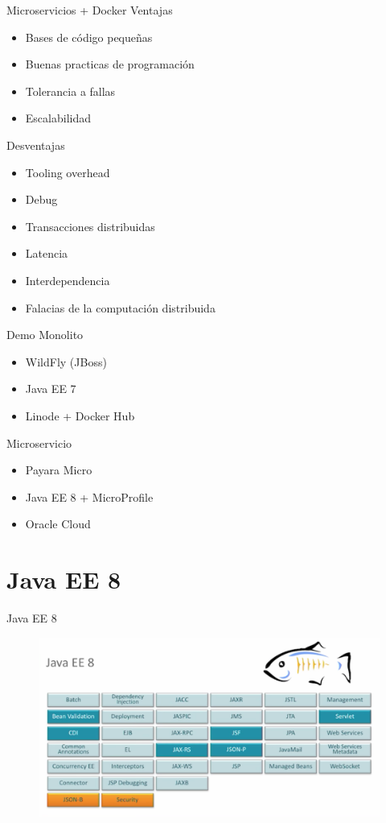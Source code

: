 \documentclass{beamer}
\begin{document}
\begin{frame}{Microservicios + Docker}
Ventajas
\begin{itemize}
	\item Bases de código pequeñas
	\item Buenas practicas de programación
	\item Tolerancia a fallas
	\item Escalabilidad
\end{itemize}
Desventajas
\begin{itemize}
	\item Tooling overhead
	\item Debug
	\item Transacciones distribuidas
	\item Latencia
	\item Interdependencia
	\item Falacias de la computación distribuida
\end{itemize}
\end{frame}

\begin{frame}{Demo}
Monolito
\begin{itemize}
	\item WildFly (JBoss)
	\item Java EE 7
	\item Linode + Docker Hub
\end{itemize}

Microservicio
\begin{itemize}
	\item Payara Micro
	\item Java EE 8 + MicroProfile
	\item Oracle Cloud
\end{itemize}
\end{frame}


\section{Java EE 8}
\begin{frame}{Java EE 8}
\begin{figure}
	\centering
	\includegraphics[width=\linewidth]{Images/javaee8}
\end{figure}
\end{frame}
\end{document}
